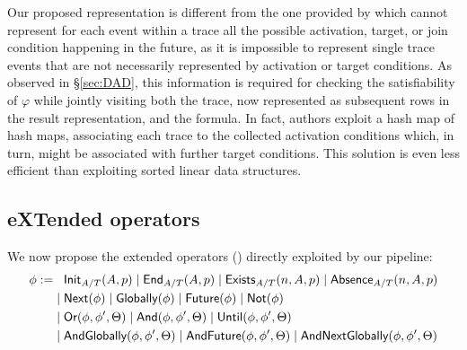 Our proposed representation is different from the one provided by \cite{BurattinMS16} which cannot represent for each event within a trace all the possible activation, target, or join condition happening in the future, as it is impossible to represent single trace events that are not necessarily represented by activation or target conditions. As observed in \S\ref{sec:DAD}, this information is required for checking the satisfiability of $\varphi$ while jointly visiting both the trace, now represented as subsequent rows in the result representation, and the formula. 
In fact, authors exploit
a hash map of hash maps, associating  each trace to the collected activation conditions which, in turn, might be associated with further target conditions. 
This solution is even less efficient than exploiting sorted linear data structures.



\subsection{eXTended \LTLf operators}\label{sec:xltlf}

We now propose the extended \LTLf operators (\xLTLf) directly exploited by our pipeline:
\[\begin{split}
\phi:=&\;\;\;\textsf{Init}_{A/T}(A,p)\;|\;\textsf{End}_{A/T}(A,p)\;|\;\textsf{Exists}_{A/T}(n,A,p)\;|\;\textsf{Absence}_{A/T}(n,A,p)\\
     &\;|\; \textsf{Next}(\phi)\;|\; \textsf{Globally}(\phi)\;|\; \textsf{Future}(\phi)\;|\; \textsf{Not}(\phi)\\
     &\;|\; \textsf{Or}(\phi,\phi',\Theta)\;|\; \textsf{And}(\phi,\phi',\Theta)\;|\; \textsf{Until}(\phi,\phi',\Theta)\\
     &\;|\; \textsf{AndGlobally}(\phi,\phi',\Theta)\;|\; \textsf{AndFuture}(\phi,\phi',\Theta)\;|\; \textsf{AndNextGlobally}(\phi,\phi',\Theta)\\
\end{split}\]

